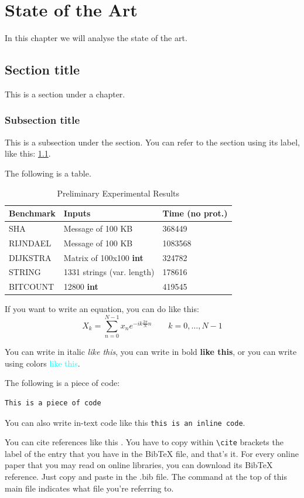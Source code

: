 \documentclass[%
    formato=a4paper,
    corpo=11pt,
    twoside,
    stile=standard,
    tipotesi=magistrale,
    evenboxes,
    english
]{toptesi}
\begin{document}
\chapter{State of the Art}
In this chapter we will analyse the state of the art.
\section{Section title}\label{examplesection}
This is a section under a chapter.
\subsection{Subsection title}
This is a subsection under the section. You can refer to the section using its label, like this: \ref{examplesection}.

The following is a table.

\begin{table}
\centering
\caption{Preliminary Experimental Results}
\begin{tabular}{| p{3cm} | p{3cm} | p{3cm} |}
    \hline
    \textbf{Benchmark} & \textbf{Inputs} & \textbf{Time (no prot.)} \\ \hline
    SHA & Message of 100 KB & 368449 \\ \hline
    RIJNDAEL & Message of 100 KB & 1083568 \\ \hline
    DIJKSTRA & Matrix of 100x100 \textbf{int} & 324782 \\ \hline
    STRING & 1331 strings (var. length) & 178616 \\ \hline
    BITCOUNT & 12800 \textbf{int} & 419545 \\ \hline
    \hline
\end{tabular}
\label{tab:ar}
\end{table}

If you want to write an equation, you can do like this:
\begin{equation}
X_{k}=\sum _{n=0}^{N-1}x_{n}e^{-ik{\frac {2\pi }{N}}n}\quad \quad k=0,\dots ,N-1
\end{equation}

You can write in italic \emph{like this}, you can write in bold \textbf{like this}, or you can write using colors \textcolor{cyan}{like this}.

The following is a piece of code:

\begin{lstlisting}
This is a piece of code
\end{lstlisting}

You can also write in-text code like this \lstinline{this is an inline code}.

You can cite references like this \cite{lee2016introduction} \cite{jiang2013towards}. You have to copy within \lstinline{\cite} brackets the label of the entry that you have in the BibTeX file, and that's it. For every online paper that you may read on online libraries, you can download its BibTeX reference. Just copy and paste in the .bib file. The command \lstinline{} at the top of this main file indicates what file you're referring to.



\cleardoublepage
{}
{}
\printbibliography
\end{document}
